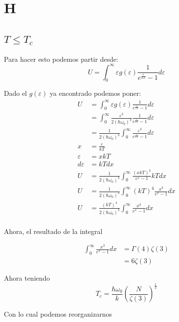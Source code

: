 \documentclass{report}
\begin{document}
\section{H}

\subsection{$T \le T_c$}
Para hacer esto podemos partir desde:
\[
  U = \int_0^\infty \varepsilon g(\varepsilon) \frac{1}{e^{\frac{\varepsilon}{kT}} - 1} d\varepsilon
\]

Dado el $g(\varepsilon)$ ya encontrado podemos poner:
\begin{align*}
  U &= \int_0^\infty \varepsilon g(\varepsilon) \frac{1}{e^{\frac{\varepsilon}{kT}} - 1} d\varepsilon\\
  &= \int_0^\infty \frac{\varepsilon^3}{2 (\hbar \omega_0)^3} \frac{1}{e^{\frac{\varepsilon}{kT}} - 1} d\varepsilon\\
  &= \frac{1}{2 (\hbar \omega_0)^3}\int_0^\infty  \frac{\varepsilon^3}{e^{\frac{\varepsilon}{kT}} - 1} d\varepsilon\\
  x &= \frac{\varepsilon}{kT}\\
  \varepsilon &= x kT\\
  d\varepsilon &= kT dx\\
  U &= \frac{1}{2 (\hbar \omega_0)^3} \int_0^\infty  \frac{(x kT)^3}{e^{x} - 1} kT dx\\
  U &= \frac{1}{2 (\hbar \omega_0)^3} \int_0^\infty  (kT)^4 \frac{x^3}{e^{x} - 1} dx\\
  U &= \frac{(kT)^4}{2 (\hbar \omega_0)^3} \int_0^\infty   \frac{x^3}{e^{x} - 1} dx\\
\end{align*}

Ahora, el resultado de la integral 

\begin{align*}
  \int_0^\infty \frac{x^3}{e^x - 1} dx &= \Gamma(4)\zeta(3)\\
  &= 6 \zeta(3)
\end{align*}

Ahora teniendo
\[
  T_c = \frac{\hbar \omega_0}{k} \left( \frac{N}{\zeta(3)} \right)^{\frac{1}{3}}
\]

Con lo cual podemos reorganizarnos
\end{document}

